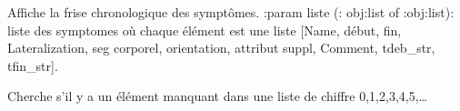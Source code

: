 \documentclass[letterpaper,10pt,english]{sphinxmanual}
\begin{document}
\begin{fulllineitems}
\label{\detokenize{frise:frise.fonctions_frise.afficher_frise}}
\pysigstartsignatures
{}
\pysigstopsignatures
\sphinxAtStartPar
Affiche la frise chronologique des symptômes.
:param liste (: obj:list of :obj:list): liste des symptomes où chaque élément est une liste {[}Name, début, fin, Lateralization, seg corporel, orientation, attribut suppl, Comment, tdeb\_str, tfin\_str{]}.

\end{fulllineitems}


\begin{fulllineitems}
\label{\detokenize{frise:frise.fonctions_frise.chercherElt}}
\pysigstartsignatures
{}
\pysigstopsignatures
\sphinxAtStartPar
Cherche s’il y a un élément manquant dans une liste de chiffre 0,1,2,3,4,5,…

\end{fulllineitems}

\end{document}
